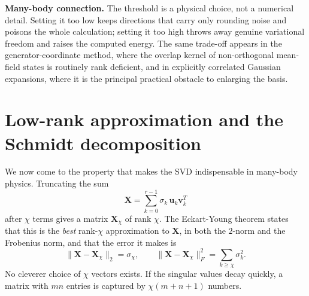 \begin{notebox}
\textbf{Many-body connection.} The threshold is a physical choice, not a
numerical detail.  Setting it too low keeps directions that carry only
rounding noise and poisons the whole calculation; setting it too high throws
away genuine variational freedom and raises the computed energy.  The same
trade-off appears in the generator-coordinate method, where the overlap
kernel of non-orthogonal mean-field states is routinely rank deficient, and
in explicitly correlated Gaussian expansions, where it is the principal
practical obstacle to enlarging the basis.
\end{notebox}

\section{Low-rank approximation and the Schmidt decomposition}
\label{sec:schmidt}

We now come to the property that makes the SVD indispensable in many-body
physics.  Truncating the sum
\begin{equation}
  \bm{X} = \sum_{k=0}^{r-1}\sigma_k\,\bm{u}_k\bm{v}_k^{T}
  \label{eq:1-svdsum}
\end{equation}
after $\chi$ terms gives a matrix $\bm{X}_{\chi}$ of rank $\chi$.  The
Eckart-Young theorem states that this is the \emph{best} rank-$\chi$
approximation to $\bm{X}$, in both the $2$-norm and the Frobenius norm, and
that the error it makes is
\begin{equation}
  \|\bm{X}-\bm{X}_{\chi}\|_2 = \sigma_{\chi},
  \qquad
  \|\bm{X}-\bm{X}_{\chi}\|_F^2 = \sum_{k\ge\chi}\sigma_k^2 .
  \label{eq:1-eckartyoung}
\end{equation}
No cleverer choice of $\chi$ vectors exists.  If the singular values decay
quickly, a matrix with $mn$ entries is captured by $\chi(m+n+1)$ numbers.

